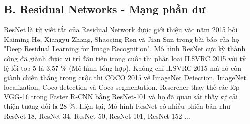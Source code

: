 \documentclass{article}
\begin{document}
	\subsection{B. Residual Networks - Mạng phần dư}
	ResNet là từ viết tắt của Residual Network được giới thiệu vào năm 2015 bởi Kaiming He, Xiangyu Zhang, Shaoqing Ren và Jian Sun trong bài báo của họ "Deep Residual Learning for Image Recognition". Mô hình ResNet cực kỳ thành công đã giành được vị trí đầu tiên trong cuộc thi phân loại ILSVRC 2015 với tỷ lệ lỗi top 5 là 3,57 \% (Mô hình tổng hợp). Không chỉ ILSVRC 2015 mà nó còn giành chiến thắng trong cuộc thi COCO 2015 về ImageNet Detection, ImageNet localization, Coco detection và Coco segmentation. Resercher thay thế các lớp VGG-16 trong Faster R-CNN bằng ResNet-101 và họ đã quan sát thấy sự cải thiện tương đối là 28 \%. Hiện tại, Mô hình ResNet có nhiều phiên bản như ResNet-18, ResNet-34, ResNet-50, ResNet-101, ResNet-152 ...
	
\end{document}
